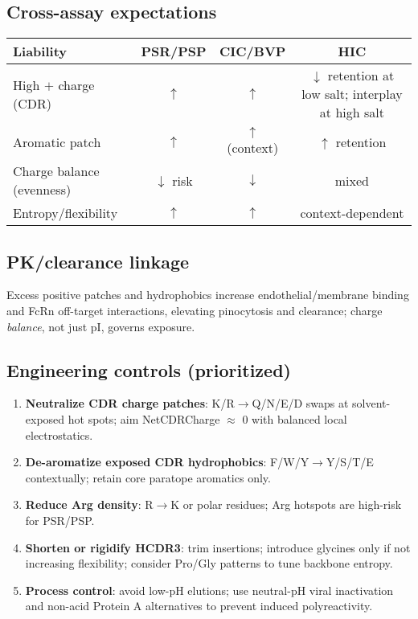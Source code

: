 \subsection*{Cross-assay expectations}
\begin{center}
\begin{tabular}{lccc}
\hline
\textbf{Liability} & \textbf{PSR/PSP} & \textbf{CIC/BVP} & \textbf{HIC}\\
\hline
High $+$ charge (CDR) & $\uparrow$ & $\uparrow$ & $\downarrow$ retention at low salt; interplay at high salt\\
Aromatic patch & $\uparrow$ & $\uparrow$ (context) & $\uparrow$ retention\\
Charge balance (evenness) & $\downarrow$ risk & $\downarrow$ & mixed\\
Entropy/flexibility & $\uparrow$ & $\uparrow$ & context-dependent\\
\hline
\end{tabular}
\end{center}

\subsection*{PK/clearance linkage}
Excess positive patches and hydrophobics increase endothelial/membrane binding and FcRn off-target interactions, elevating pinocytosis and clearance; charge \emph{balance}, not just pI, governs exposure.

\subsection*{Engineering controls (prioritized)}
\begin{enumerate}\setlength\itemsep{2pt}
\item \textbf{Neutralize CDR charge patches}: K/R$\rightarrow$Q/N/E/D swaps at solvent-exposed hot spots; aim NetCDRCharge $\approx$ 0 with balanced local electrostatics.
\item \textbf{De-aromatize exposed CDR hydrophobics}: F/W/Y$\rightarrow$Y/S/T/E contextually; retain core paratope aromatics only.
\item \textbf{Reduce Arg density}: R$\rightarrow$K or polar residues; Arg hotspots are high-risk for PSR/PSP.
\item \textbf{Shorten or rigidify HCDR3}: trim insertions; introduce glycines only if not increasing flexibility; consider Pro/Gly patterns to tune backbone entropy.
\item \textbf{Process control}: avoid low-pH elutions; use neutral-pH viral inactivation and non-acid Protein A alternatives to prevent induced polyreactivity.
\end{enumerate}

